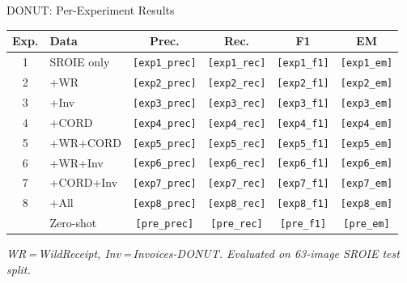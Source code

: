 \documentclass[aspectratio=169,11pt]{beamer}
\newcommand{\VAR}[1]{\texttt{[#1]}\xspace}
\begin{document}
\begin{frame}{DONUT: Per-Experiment Results}
  \centering
  {\small
  \begin{tabular}{@{}clcccc@{}}
    \toprule
    \textbf{Exp.} & \textbf{Data} &
    \textbf{Prec.} & \textbf{Rec.} &
    \textbf{F1} & \textbf{EM} \\
    \midrule
    1 & SROIE only       & \VAR{exp1_prec} & \VAR{exp1_rec} & \VAR{exp1_f1} & \VAR{exp1_em} \\
    2 & +WR              & \VAR{exp2_prec} & \VAR{exp2_rec} & \VAR{exp2_f1} & \VAR{exp2_em} \\
    3 & +Inv             & \VAR{exp3_prec} & \VAR{exp3_rec} & \VAR{exp3_f1} & \VAR{exp3_em} \\
    4 & +CORD            & \VAR{exp4_prec} & \VAR{exp4_rec} & \VAR{exp4_f1} & \VAR{exp4_em} \\
    5 & +WR+CORD         & \VAR{exp5_prec} & \VAR{exp5_rec} & \VAR{exp5_f1} & \VAR{exp5_em} \\
    6 & +WR+Inv          & \VAR{exp6_prec} & \VAR{exp6_rec} & \VAR{exp6_f1} & \VAR{exp6_em} \\
    7 & +CORD+Inv        & \VAR{exp7_prec} & \VAR{exp7_rec} & \VAR{exp7_f1} & \VAR{exp7_em} \\
    8 & +All             & \VAR{exp8_prec} & \VAR{exp8_rec} & \VAR{exp8_f1} & \VAR{exp8_em} \\
    \midrule
      & Zero-shot        & \VAR{pre_prec}  & \VAR{pre_rec}  & \VAR{pre_f1}  & \VAR{pre_em} \\
    \bottomrule
  \end{tabular}
  }

  \vspace{0.3cm}
  {\small\textit{WR\,=\,WildReceipt, Inv\,=\,Invoices-DONUT.
  Evaluated on 63-image SROIE test split.}}
\end{frame}
\end{document}
